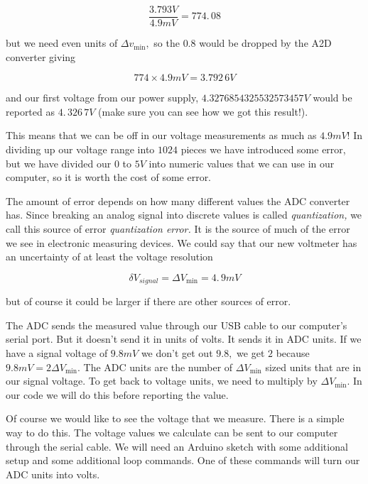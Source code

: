 \begin{equation*}
	\frac{3.793\unit{V}}{4.9\unit{mV}}=774.\,\allowbreak 08
\end{equation*}

\noindent but we need even units of $\Delta v_{\min },$ so the $0.8$ would be dropped by the A2D converter giving 

\begin{equation*}
	774\times 4.9\unit{mV}=\allowbreak 3.792\,\allowbreak 6\unit{V}
\end{equation*}

\noindent and our first voltage from our power supply, $4.3276854325532573457\unit{V}$ would be reported as $4.\,\allowbreak 326\,7\unit{V}$ (make sure you can see how we got this result!).

This means that we can be off in our voltage measurements as much as $4.9\unit{mV}$! In dividing up our voltage range into $1024$ pieces we have introduced some error, but we have divided our $0$ to $5\unit{V}$ into numeric values that we can use in our computer, so it is worth the cost of some error.

The amount of error depends on how many different values the ADC converter has. Since breaking an analog signal into discrete values is called \emph{quantization, }we call this source of error \emph{quantization error.} It is the source of much of the error we see in electronic measuring devices. We could say that our new voltmeter has an uncertainty of at least the voltage resolution

\begin{equation*}
	\delta V_{signal}=\Delta V_{\min }=4.\,\allowbreak 9\unit{mV}
\end{equation*}

\noindent but of course it could be larger if there are other sources of error.

The ADC sends the measured value through our USB cable to our computer's serial port. But it doesn't send it in units of volts. It sends it in ADC units. If we have a signal voltage of $9.8\unit{mV}$ we don't get out $9.8,$ we get $2$ because $9.8\unit{mV}=2\Delta V_{\min }.$ The ADC units are the number of $\Delta V_{\min }$ sized units that are in our signal voltage. To get back to voltage units, we need to multiply by $\Delta V_{\min }.$ In our code we will do this before reporting the value. 

Of course we would like to see the voltage that we measure. There is a simple way to do this. The voltage values we calculate can be sent to our computer through the serial cable. We will need an Arduino sketch with some additional setup and some additional loop commands. One of these commands will turn our ADC units into volts. 

